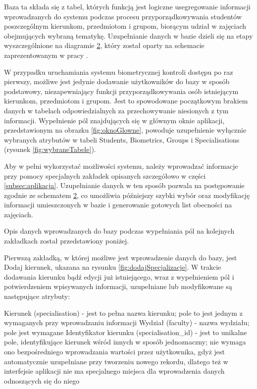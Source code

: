  
\begin{figure}
\label{fig:bazaDanych}
\end{figure}

Baza ta składa się z tabel, których funkcją jest logiczne usegregowanie informacji wprowadzanych do systemu podczas procesu przyporządkowywania studentów poszczególnym kierunkom, przedmiotom i grupom, biorącym udział w zajęciach obejmujących wybraną tematykę. Uzupełnianie danych w bazie dzieli się na etapy wyszczególnione na diagramie \ref{fig:etapyDzialania}, który został oparty na schemacie zaprezentowanym w pracy \cite{Gl11}.

\begin{figure}
\label{fig:etapyDzialania}
\end{figure}

W przypadku uruchamiania systemu biometrycznej kontroli dostępu po raz pierwszy, możliwe jest jedynie dodawanie użytkowników do bazy w sposób podstawowy, niezapewniający funkcji przyporządkowywania osób istniejącym kierunkom, przedmiotom i grupom. Jest to spowodowane początkowym brakiem danych w tabelach odpowiedzialnych za przechowywanie niesionych z tym informacji. Wypełnienie pól znajdujących się w głównym oknie aplikacji, przedstawionym na obrazku \ref{fig:oknoGlowne}, powoduje uzupełnienie wyłącznie wybranych atrybutów w tabeli Students, Biometrics, Groups i Specialisations (rysunek \ref{fig:wybraneTabele}). 

Aby w pełni wykorzystać możliwości systemu, należy wprowadzać informacje przy pomocy specjalnych zakładek opisanych szczegółowo w części \ref{subsec:aplikacja}. Uzupełnianie danych w ten sposób pozwala na postępowanie zgodnie ze schematem \ref{fig:etapyDzialania}, co umożliwia późniejszy szybki wybór oraz modyfikację informacji umieszczonych w bazie i generowanie gotowych list obecności na zajęciach.

Opis danych wprowadzanych do bazy podczas wypełniania pól na kolejnych zakładkach został przedstawiony poniżej.

Pierwszą zakładką, w której możliwe jest wprowadzenie danych do bazy, jest Dodaj kierunek, ukazana na rysunku \ref{fig:dodajSpecjalizacje}. W trakcie dodawania kierunku bądź edycji już istniejącego, wraz z wypełnieniem pól i potwierdzeniem wpisywanych informacji, uzupełniane lub modyfikowane są następujące atrybuty:

Kierunek (specialisation) - jest to pełna nazwa kierunku; pole to jest jednym z wymaganych przy wprowadzaniu informacji 
Wydział (faculty) - nazwa wydziału; pole jest wymagane
Identyfikator kierunku (specialisation_id) - jest to unikalne pole, identyfikujące kierunek wśród innych w sposób jednoznaczny; nie wymaga ono bezpośredniego wprowadzania wartości przez użytkownika, gdyż jest automatycznie uzupełniane przy tworzeniu nowego rekordu, dlatego też w interfejsie aplikacji nie ma specjalnego miejsca dla wprowadzenia danych odnoszących się do niego

